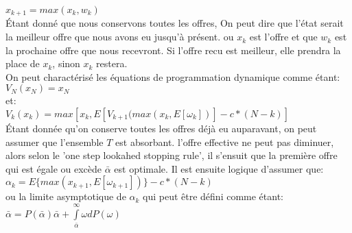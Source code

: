 \documentclass[oneside]{book}
\begin{document}
$x_{k+1} = max(x_k, w_k)$\\

Étant donné que nous conservons toutes les offres, On peut dire que l'état serait la meilleur offre que nous avons eu jusqu'à présent. ou $x_k$ est l'offre et que $w_k$ est la prochaine offre que nous recevront. Si l'offre recu est meilleur, elle prendra la place de $x_k$, sinon $x_k$ restera.\\

On peut charactérisé les équations de programmation dynamique comme étant:\\

$V_N(x_N) = x_N$\\

et:\\

$V_k(x_k) = max[x_k ,E[V_{k+1}(max(x_k,E[\omega_k])] - c*(N-k) ]$\\

Étant donnée qu'on conserve toutes les offres déjà eu auparavant, on peut assumer que l'ensemble $T$ est absorbant. l'offre effective ne peut pas diminuer, alors selon le 'one step lookahed stopping rule', il s'ensuit que la première offre qui est égale ou excède $\bar{\alpha}$ est optimale. Il est ensuite logique d'assumer que:\\

$\alpha_k = E\{max(x_{k+1},E[\omega_{k+1}])\} - c*(N-k)$\\

ou la limite asymptotique de $\alpha_k$ qui peut être défini comme étant:\\

$\bar{\alpha} = P(\bar{\alpha})\bar{\alpha} + \int\limits_{\bar{\alpha}}^{\infty}\omega dP(\omega)$
\end{document}
